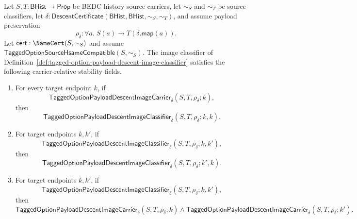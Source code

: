 \begin{theorem}
\label{thm:tagged-option-payload-descent-image-classifier-stability-fields}
Let $S,T:\mathsf{BHist}\to\mathsf{Prop}$ be BEDC history source carriers, let
$\sim_S$ and $\sim_T$ be source classifiers, let
$\delta:\mathsf{DescentCertificate}(\mathsf{BHist},\mathsf{BHist},\sim_S,\sim_T)$,
and assume payload preservation
$$
\rho_{\delta}:\forall a.\;S(a)\to T(\delta.\mathsf{map}(a)).
$$
Let $\mathsf{cert}:\NameCert(S,\sim_S)$ and assume
$\mathsf{TaggedOptionSourceHsameCompatible}(S,\sim_S)$. The image classifier of
Definition~\ref{def:tagged-option-payload-descent-image-classifier} satisfies
the following carrier-relative stability fields.
\begin{enumerate}
  \item For every target endpoint $k$, if
  $$
  \mathsf{TaggedOptionPayloadDescentImageCarrier}_{\delta}
  (S,T,\rho_{\delta};k),
  $$
  then
  $$
  \mathsf{TaggedOptionPayloadDescentImageClassifier}_{\delta}
  (S,T,\rho_{\delta};k,k).
  $$
  \item For target endpoints $k,k'$, if
  $$
  \mathsf{TaggedOptionPayloadDescentImageClassifier}_{\delta}
  (S,T,\rho_{\delta};k,k'),
  $$
  then
  $$
  \mathsf{TaggedOptionPayloadDescentImageClassifier}_{\delta}
  (S,T,\rho_{\delta};k',k).
  $$
  \item For target endpoints $k,k'$, if
  $$
  \mathsf{TaggedOptionPayloadDescentImageClassifier}_{\delta}
  (S,T,\rho_{\delta};k,k'),
  $$
  then
  $$
  \mathsf{TaggedOptionPayloadDescentImageCarrier}_{\delta}
  (S,T,\rho_{\delta};k)
  \land
  \mathsf{TaggedOptionPayloadDescentImageCarrier}_{\delta}
  (S,T,\rho_{\delta};k').
  $$
\end{enumerate}
\end{theorem}
